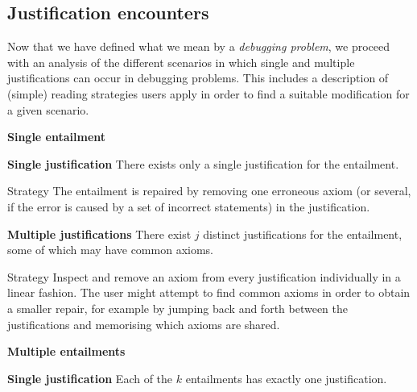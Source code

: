 \subsection{Justification encounters}
\label{sec:encounters}

Now that we have defined what we mean by a \emph{debugging problem}, we proceed with an analysis of the different scenarios in which single and multiple justifications can occur in debugging problems. This includes a description of (simple) reading strategies users apply in order to find a suitable modification for a given scenario.

\begin{compactenum}

\item \textbf{Single entailment} 

\begin{compactenum}

\item \textbf{Single justification} There exists only a single justification for the entailment.

\begin{compactdesc}
\item[Strategy] The entailment is repaired by removing one erroneous axiom (or several, if the error is caused by a set of incorrect statements) in the justification.
\end{compactdesc}

\item \textbf{Multiple justifications} There exist $j$ distinct justifications for the entailment, some of which may have common axioms.
\begin{compactdesc}
\item[Strategy] Inspect and remove an axiom from every justification individually in a linear fashion. The user might attempt to find common axioms in order to obtain a smaller repair, for example by jumping back and forth between the justifications and memorising which axioms are shared.
\end{compactdesc}

\end{compactenum}

\item \textbf{Multiple entailments} 

\begin{compactenum}

\item \textbf{Single justification} Each of the $k$ entailments has exactly one justification.


\end{compactenum}
\end{compactenum}
